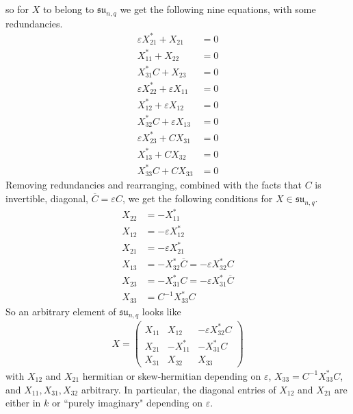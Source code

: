 \documentclass[12pt]{article}
\theoremstyle{definition}
\numberwithin{theorem}{subsection}
\newcommand{\eps}{\varepsilon}
\newcommand{\inv}{^{-1}}
\newcommand{\ov}{\overline}
\newcommand{\fraksu}{\mathfrak{su}}
\begin{document}
so for $X$ to belong to $\fraksu_{n,q}$ we get the following nine equations, with some redundancies.
\begin{align*}
	\eps X_{21}^* + X_{21} &= 0 \\
	X_{11}^* + X_{22} &= 0 \\
	X_{31}^* C + X_{23} &= 0 \\
	\eps X_{22}^* + \eps X_{11} &= 0 \\
	X_{12}^* + \eps X_{12} &= 0 \\
	X_{32}^* C +\eps X_{13} &= 0 \\
	\eps X_{23}^* + CX_{31} &= 0 \\
	X_{13}^* + C X_{32} &= 0 \\
	X_{33}^* C + C X_{33} &= 0
\end{align*}
Removing redundancies and rearranging, combined with the facts that $C$ is invertible, diagonal, $\ov C = \eps C$, we get the following conditions for $X \in \fraksu_{n,q}$.
\begin{align*}
	X_{22} &= -X_{11}^* \\
	X_{12} &= - \eps X_{12}^* \\
	X_{21} &= - \eps X_{21}^* \\
	X_{13} &= - X_{32}^* \ov C = - \eps X_{32}^* C \\
	X_{23} &= - X_{31}^* C = - \eps X_{31}^* \ov C \\
	X_{33} &= C \inv X_{33}^* C
\end{align*}
So an arbitrary element of $\fraksu_{n,q}$ looks like
\begin{align*}
	X = \begin{pmatrix}
		X_{11} & X_{12} & - \eps X_{32}^* C \\
		X_{21} & - X_{11}^* & - X_{31}^* C \\
		X_{31} & X_{32} & X_{33}
		\end{pmatrix}
\end{align*}
with $X_{12}$ and $X_{21}$ hermitian or skew-hermitian depending on $\eps$, $X_{33} = C \inv X_{33}^* C$, and $X_{11}, X_{31}, X_{32}$ arbitrary. In particular, the diagonal entries of $X_{12}$ and $X_{21}$ are either in $k$ or ``purely imaginary" depending on $\eps$.
\end{document}
